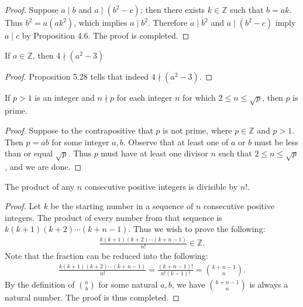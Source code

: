 \documentclass{exam}
\begin{document}
\begin{proof}
    Suppose $a\mid b$ and $a\mid (b^2-c)$; then there exists $k\in\mathbb Z$ such that $b = ak$. Thus $b^2 = a(ak^2)$, which implies $a\mid b^2$. Therefore $a\mid b^2$ and $a\mid (b^2-c)$ imply $a\mid c$ by Proposition 4.6. The proof is completed.
\end{proof}

\begin{proposition}{7.24}
    If $a\in\mathbb Z$, then $4\nmid (a^2 - 3)$
\end{proposition}

\begin{proof}
    Proposition 5.28 tells that indeed $4\nmid (a^2 - 3)$.
\end{proof}

\begin{proposition}{7.25}
    If $p>1$ is an integer and $n\nmid p$ for each integer $n$ for which $2\le n\le\sqrt p$, then $p$ is prime.
\end{proposition}

\begin{proof}
    Suppose to the contrapositive that $p$ is not prime, where $p \in\mathbb Z$ and $p > 1$. Then $p=ab$ for some integer $a, b$. Observe that at least one of $a$ or $b$ must be less than or equal $\sqrt{p}$. Thus $p$ must have at least one divisor $n$ such that $2\le n\le\sqrt p$, and we are done.
\end{proof}

\begin{proposition}{7.26}
    The product of any $n$ consecutive positive integers is divisible by $n!$.
\end{proposition}

\begin{proof}
    Let $k$ be the starting number in a sequence of $n$ consecutive positive integers. The product of every number from that sequence is $k(k+1)(k+2)\cdots(k+n-1)$. Thus we wish to prove the following:
    \begin{align*}
        \frac{k(k+1)(k+2)\cdots(k+n-1)}{n!}\in\mathbb Z.
    \end{align*}
    Note that the fraction can be reduced into the following:
    \begin{align*}
        \frac{k(k+1)(k+2)\cdots(k+n-1)}{n!} = \frac{(k+n-1)!}{n!(k-1)!} = \binom{k+n-1}{n}.
    \end{align*}
    By the definition of $\binom{a}{b}$ for some natural $a, b$, we have $\binom{k+n-1}{n}$ is always a natural number. The proof is thus completed.
\end{proof}
\end{document}
